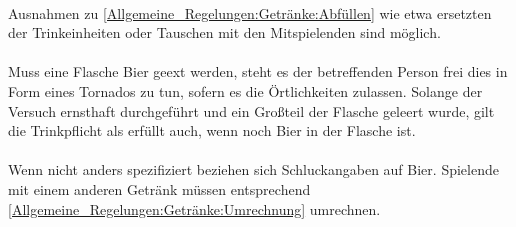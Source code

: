 \paragraph{}
Ausnahmen zu \ref{Allgemeine_Regelungen:Getränke:Abfüllen} wie etwa ersetzten der Trinkeinheiten oder Tauschen mit den Mitspielenden sind möglich.

\paragraph{}
Muss eine Flasche Bier geext werden, steht es der betreffenden Person frei dies in Form eines Tornados zu tun, sofern es die Örtlichkeiten zulassen.
Solange der Versuch ernsthaft durchgeführt und ein Großteil der Flasche geleert wurde, gilt die Trinkpflicht als erfüllt auch, wenn noch Bier in der Flasche ist.

\paragraph{}
Wenn nicht anders spezifiziert beziehen sich Schluckangaben auf Bier.
Spielende mit einem anderen Getränk müssen entsprechend \ref{Allgemeine_Regelungen:Getränke:Umrechnung} umrechnen.